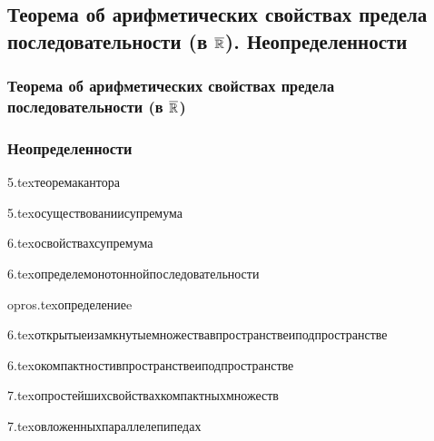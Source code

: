 \subsection{\teormin Теорема об арифметических свойствах предела последовательности (в $\overline{\mathbb{R}}$). Неопределенности}
\subsubsection{Теорема об арифметических свойствах предела последовательности (в $\overline{\mathbb{R}}$)}
\subsubsection{Неопределенности}

{5.tex}{теоремакантора}

{5.tex}{осуществованиисупремума}

{6.tex}{освойствахсупремума}

{6.tex}{определемонотоннойпоследовательности}

{opros.tex}{определениеe}

{6.tex}{открытыеизамкнутыемножествавпространствеиподпространстве}

{6.tex}{окомпактностивпространствеиподпространстве}

{7.tex}{опростейшихсвойствахкомпактныхмножеств}

{7.tex}{овложенныхпараллелепипедах}

